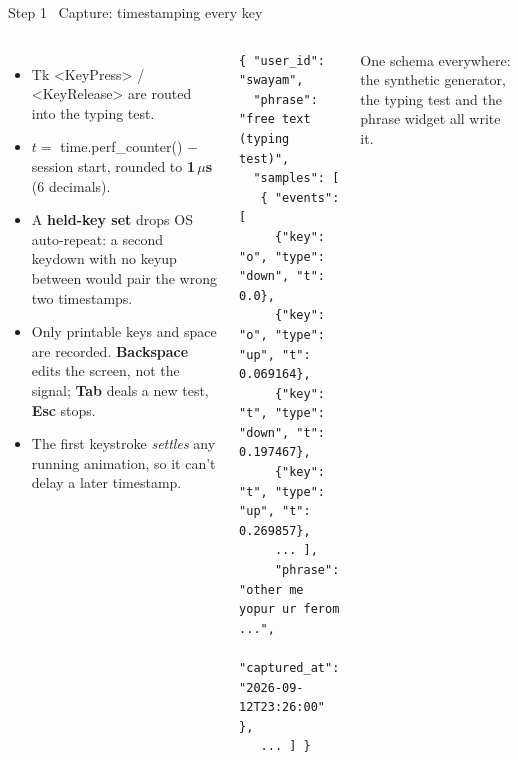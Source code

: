 \documentclass[aspectratio=169,11pt,t]{beamer}
\newcommand\code[1]{{\ttfamily\color{terradk}#1}}
\begin{document}
\begin{frame}[fragile]{Step 1 \textperiodcentered\ Capture: timestamping every key}
\begin{columns}[T,onlytextwidth]
\small
\begin{itemize}\setlength\itemsep{2pt}
\item Tk \code{<KeyPress>} / \code{<KeyRelease>} are routed into the typing test.
\item \(t = \) \code{time.perf\_counter()} \(-\) session start, rounded to \textbf{1\,\(\mu\)s} (6 decimals).
\item A \textbf{held-key set} drops OS auto-repeat: a second keydown with no keyup between would pair the wrong two timestamps.
\item Only printable keys and space are recorded. \textbf{Backspace} edits the screen, not the signal;
      \textbf{Tab} deals a new test, \textbf{Esc} stops.
\item The first keystroke \emph{settles} any running animation, so it can't delay a later timestamp.
\end{itemize}
\begin{tcolorbox}[enhanced,colback=ink,colframe=ink,arc=6pt,left=2pt,right=2pt,top=6pt,bottom=6pt,
  title={\faFileCode[regular]\ \ttfamily data/synthetic/swayam.json},fonttitle=\scriptsize,coltitle=muted,colbacktitle=ink,
  titlerule=0.4pt,colframe=ink,fuzzy shadow={0.4pt}{-0.9pt}{0pt}{0.35pt}{black!20}]
\begin{lstlisting}[style=json]
{ "user_id": "swayam",
  "phrase": "free text (typing test)",
  "samples": [
   { "events": [
     {"key": "o", "type": "down", "t": 0.0},
     {"key": "o", "type": "up", "t": 0.069164},
     {"key": "t", "type": "down", "t": 0.197467},
     {"key": "t", "type": "up", "t": 0.269857},
     ... ],
     "phrase": "other me yopur ur ferom ...",
     "captured_at": "2026-09-12T23:26:00" },
   ... ] }
\end{lstlisting}
\end{tcolorbox}
{\scriptsize\color{muted}One schema everywhere: the synthetic generator, the typing test and the phrase widget all write it.}
\end{columns}
\end{frame}
\end{document}
